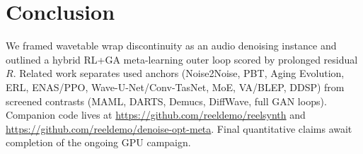 \section{Conclusion}
\label{sec:conclusion}

We framed wavetable wrap discontinuity as an audio denoising instance and outlined a hybrid RL+GA meta-learning outer loop scored by prolonged residual $R$.
Related work separates used anchors (Noise2Noise, PBT, Aging Evolution, ERL, ENAS/PPO, Wave-U-Net/Conv-TasNet, MoE, VA/BLEP, DDSP) from screened contrasts (MAML, DARTS, Demucs, DiffWave, full GAN loops).
Companion code lives at \url{https://github.com/reeldemo/reelsynth} and \url{https://github.com/reeldemo/denoise-opt-meta}.
Final quantitative claims await completion of the ongoing GPU campaign.
